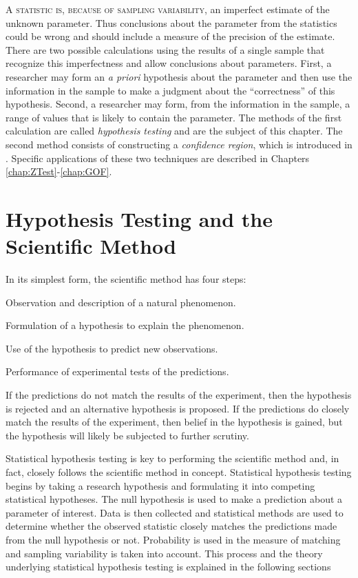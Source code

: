 \documentclass[10pt,openany]{book}\usepackage[]{graphicx}\usepackage[]{color}
\begin{document}
\lettrine{A}{ statistic is, because of sampling variability,} an imperfect estimate of the unknown parameter.  Thus conclusions about the parameter from the statistics could be wrong and should include a measure of the precision of the estimate.  There are two possible calculations using the results of a single sample that recognize this imperfectness and allow conclusions about parameters.  First, a researcher may form an \emph{a priori} hypothesis about the parameter and then use the information in the sample to make a judgment about the ``correctness'' of this hypothesis.  Second, a researcher may form, from the information in the sample, a range of values that is likely to contain the parameter.  The methods of the first calculation are called \emph{hypothesis testing} and are the subject of this chapter. The second method consists of constructing a \emph{confidence region}, which is introduced in . Specific applications of these two techniques are described in Chapters \ref{chap:ZTest}-\ref{chap:GOF}.


\section{Hypothesis Testing and the Scientific Method} \label{sect:SciMethod}
In its simplest form, the scientific method has four steps:

\begin{Enumerate}
  \item Observation and description of a natural phenomenon.
  \item Formulation of a hypothesis to explain the phenomenon.
  \item Use of the hypothesis to predict new observations.
  \item Performance of experimental tests of the predictions.
\end{Enumerate}

If the predictions do not match the results of the experiment, then the hypothesis is rejected and an alternative hypothesis is proposed.  If the predictions do closely match the results of the experiment, then belief in the hypothesis is gained, but the hypothesis will likely be subjected to further scrutiny.

Statistical hypothesis testing is key to performing the scientific method and, in fact, closely follows the scientific method in concept.  Statistical hypothesis testing begins by taking a research hypothesis and formulating it into competing statistical hypotheses.  The null hypothesis is used to make a prediction about a parameter of interest.  Data is then collected and statistical methods are used to determine whether the observed statistic closely matches the predictions made from the null hypothesis or not.  Probability is used in the measure of matching and sampling variability is taken into account.  This process and the theory underlying statistical hypothesis testing is explained in the following sections
\end{document}
